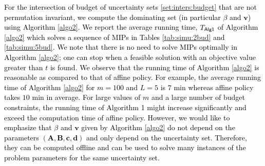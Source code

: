 \documentclass[11pt]{article}
\theoremstyle{plain}
\theoremstyle{definition}
\numberwithin{equation}{section}%
\numberwithin{equation}{section}%
\newcommand{\mb}[1]{\ensuremath{\boldsymbol{#1}}}
\newcommand*{\red}{\textcolor{black}}
\begin{document}
\red{
For the intersection of budget of uncertainty sets \eqref{set:inters:budget} that are not permutation invariant, we compute the dominating set (in particular $\beta$ and $\mb v$) using Algorithm \ref{algo2}. We report the average running time, $T_{\sf Alg1}$ of Algorithm \ref{algo2} which solves a sequence of MIPs in Tables \ref{tab:simu:2bud} and \ref{tab:simu:5bud}. %
We note that there is no need to solve MIPs optimally in Algorithm \ref{algo2}; one can stop when a feasible solution with  an objective value greater than $t$ is found. We observe  that the running time of Algorithm \ref{algo2} is reasonable as compared to that of affine policy. For example, the average running time of  Algorithm \ref{algo2} for $m=100$ and $L=5$ is $7$ min whereas affine policy takes  $10$ min in average. For large values of $m$ and a large number of budget constraints, the running time of Algorithm 1 might increase significantly and  exceed the computation time of affine policy. However, we would like to emphasize that  $\beta $ and $\mb v$ given by Algorithm \ref{algo2}  do not depend on the  parameters $(\mb A, \mb B, \mb c, \mb d)$ and only depend on the uncertainty set. Therefore, they can be computed offline and can be used to solve many instances of the problem parameters for the same uncertainty set.}

\end{document}
